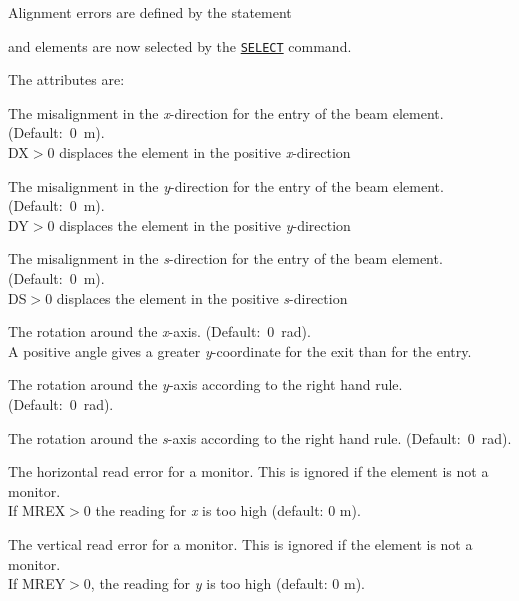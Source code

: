 Alignment errors are defined by the statement 

and elements are now selected by the
\hyperref[sec:select]{\tt SELECT} command. 

The attributes are: 
\begin{madlist}
   The misalignment in the {\it x}-direction for the entry of
  the beam element. (Default:~0~m).  \\ 
  DX$>$0 displaces the element in the positive {\it x}-direction 
  
   The misalignment in the {\it y}-direction for the entry of
  the beam element. (Default:~0~m). \\ 
  DY$>$0 displaces the element in the positive {\it y}-direction 

   The misalignment in the {\it s}-direction for the entry of
  the beam element. (Default:~0~m). \\
  DS$>$0 displaces the element in the positive {\it s}-direction 
  
   The rotation around the {\it x}-axis. (Default:~0~rad). \\ 
  A positive angle gives a greater {\it y}-coordinate for the exit
  than for the entry. 

   The rotation around the {\it y}-axis according to the
  right hand rule. (Default:~0~rad).  

   The rotation around the {\it s}-axis according to the
  right hand rule. (Default:~0~rad).  

   The horizontal read error for a monitor. This is ignored if
  the element is not a monitor. \\
  If MREX$>$0 the reading for {\it x} is too high (default: 0 m). 

   The vertical read error for a monitor. This is ignored if
  the element is not a monitor. \\  
  If MREY$>$0, the reading for {\it y} is too high (default: 0 m). 


\end{madlist}
